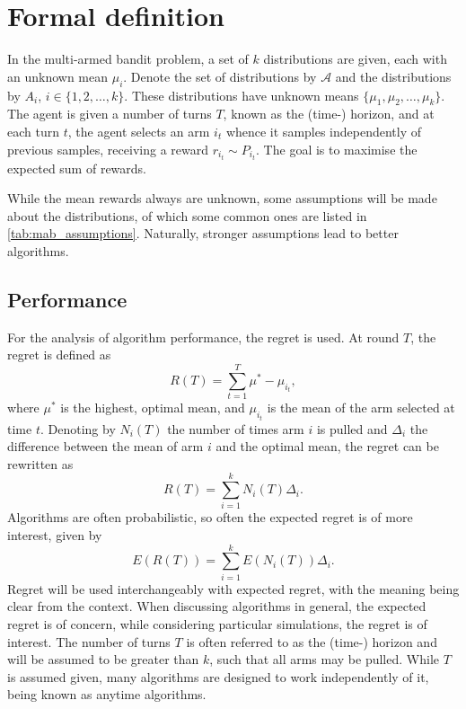 \section{Formal definition}
In the multi-armed bandit problem, a set of $k$ distributions are given, each with an unknown mean $\mu_i$.
Denote the set of distributions by $\mathcal{A}$ and the distributions by $A_i$, $i \in \{1,2,\dots,k\}$.
These distributions have unknown means $\{\mu_1, \mu_2,\dots,\mu_k\}$.
The agent is given a number of turns $T$, known as the (time-) horizon, and at each turn $t$, the agent selects an arm $i_t$ whence it samples independently of previous samples, receiving a reward $r_{i_t} \sim P_{i_t}$.
The goal is to maximise the expected sum of rewards.

While the mean rewards always are unknown, some assumptions will be made about the distributions, of which some common ones are listed in \cref{tab:mab_assumptions}.
Naturally, stronger assumptions lead to better algorithms.


\subsection{Performance}
For the analysis of algorithm performance, the regret is used.
At round $T$, the regret is defined as
\begin{equation}
    R(T) = \sum_{t=1}^T \mu^* - \mu_{i_t},
\end{equation}
where $\mu^*$ is the highest, optimal mean, and $\mu_{i_t}$ is the mean of the arm selected at time $t$.
Denoting by $N_i(T)$ the number of times arm $i$ is pulled and $\Delta_i$ the difference between the mean of arm $i$ and the optimal mean, the regret can be rewritten as
\begin{equation}
    R(T) = \sum_{i=1}^k N_i(T) \Delta_i.
\end{equation}
Algorithms are often probabilistic, so often the expected regret is of more interest, given by
\begin{equation}
    E(R(T)) = \sum_{i=1}^k E(N_i(T)) \Delta_i.
\end{equation}
Regret will be used interchangeably with expected regret, with the meaning being clear from the context.
When discussing algorithms in general, the expected regret is of concern, while considering particular simulations, the regret is of interest.
The number of turns $T$ is often referred to as the (time-) horizon and will be assumed to be greater than $k$, such that all arms may be pulled.
While $T$ is assumed given, many algorithms are designed to work independently of it, being known as anytime algorithms.

